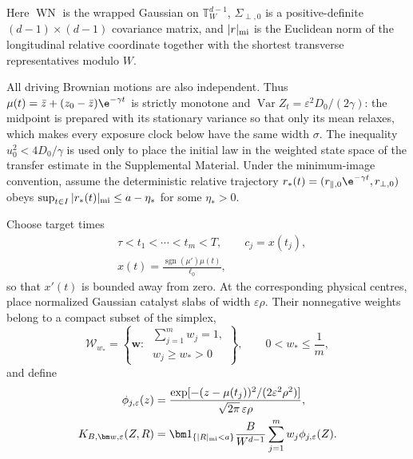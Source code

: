 Here $\operatorname{WN}$ is the wrapped Gaussian on
$\mathbb T_W^{d-1}$, $\Sigma_{\perp,0}$ is a positive-definite
$(d-1)\times(d-1)$ covariance matrix, and $|r|_{\rm mi}$ is the Euclidean norm
of the longitudinal relative coordinate together with the shortest transverse
representatives modulo $W$.

All driving Brownian motions are also independent.  Thus
$\mu(t)=\bar z+(z_0-\bar z)\e^{-\gamma t}$ is strictly monotone and
$\operatorname{Var}Z_t=\varepsilon^2D_0/(2\gamma)$: the midpoint is prepared
with its stationary variance so that only its mean relaxes, which makes every
exposure clock below have the same width $\sigma$.  The inequality
$u_0^2<4D_0/\gamma$ is used only to place the initial law in the weighted
state space of the transfer estimate in the Supplemental Material.  Under the
minimum-image
convention, assume the deterministic relative trajectory
$r_*(t)=(r_{\parallel,0}\e^{-\gamma t},r_{\perp,0})$ obeys
$\sup_{t\in I}|r_*(t)|_{\rm mi}\le a-\eta_*$ for some $\eta_*>0$.

Choose target times
\begin{equation}
 \begin{aligned}
  &\tau<t_1<\cdots<t_m<T,\qquad c_j=x(t_j),\\
  &x(t)=\frac{\operatorname{sgn}(\mu')\mu(t)}{\ell_0},
 \end{aligned}
 \label{eq:exact-m-centres}
\end{equation}
so that $x'(t)$ is bounded away from zero.  At the corresponding physical
centres, place normalized Gaussian catalyst slabs of width
$\varepsilon\rho$.  Their nonnegative weights belong to a compact subset of
the simplex,
\begin{equation}
 \mathcal W_{w_*}
 =\left\{\bm w:\
   \substack{\sum_{j=1}^{m}w_j=1,\\ w_j\ge w_*>0}\right\},
 \qquad 0<w_*\le\frac1m,
 \label{eq:exact-m-simplex}
\end{equation}
and define
\begin{equation}
 \begin{aligned}
 \phi_{j,\varepsilon}(z)
 &=\frac{\exp[-(z-\mu(t_j))^2/(2\varepsilon^2\rho^2)]}
        {\sqrt{2\pi}\,\varepsilon\rho},\\
 K_{B,\bm w,\varepsilon}(Z,R)
 &=\bm1_{\{|R|_{\rm mi}<a\}}\frac{B}{W^{d-1}}
   \sum_{j=1}^{m}w_j\phi_{j,\varepsilon}(Z).
 \end{aligned}
 \label{eq:exact-m-killing}
\end{equation}

